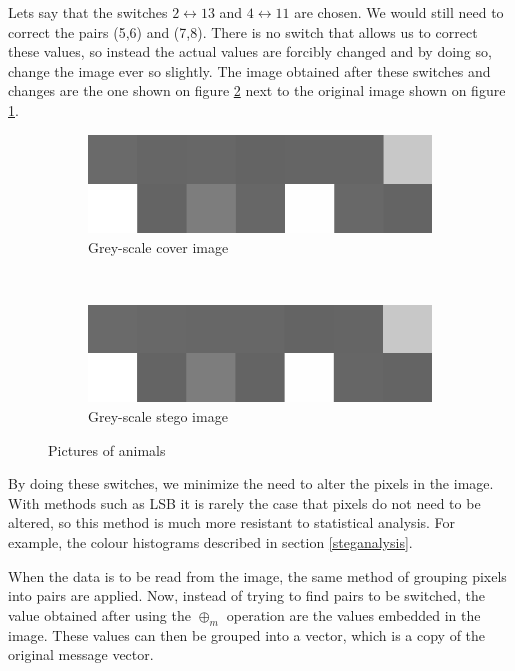 Lets say that the switches $2\leftrightarrow 13$ and $4\leftrightarrow 11$ are chosen. We would still need to correct the pairs (5,6) and (7,8). There is no switch that allows us to correct these values, so instead the actual values are forcibly changed and by doing so, change the image ever so slightly. The image obtained after these switches and changes are the one shown on figure \ref{fig:endingImage} next to the original image shown on figure \ref{fig:startingImage}.


\begin{figure}[h!]
    \centering
    \begin{subfigure}[b]{0.45\textwidth}
        \includegraphics[width=\textwidth, frame]{figures/pixelgrid.png}
		\caption{Grey-scale cover image}
		\label{fig:startingImage}
    \end{subfigure}
    ~ %
    \begin{subfigure}[b]{0.45\textwidth}
        \includegraphics[width=\textwidth, frame]{figures/pixelgrid2.png}
		\caption{Grey-scale stego image}
		\label{fig:endingImage}
    \end{subfigure}
    \caption{Pictures of animals}\label{fig:pixelGrids}
\end{figure}

By doing these switches, we minimize the need to alter the pixels in the image. With methods such as LSB it is rarely the case that pixels do not need to be altered, so this method is much more resistant to statistical analysis. For example, the colour histograms described in section \ref{steganalysis}.

When the data is to be read from the image, the same method of grouping pixels into pairs are applied. Now, instead of trying to find pairs to be switched, the value obtained after using the $\oplus_m$ operation are the values embedded in the image. These values can then be grouped into a vector, which is a copy of the original message vector.
